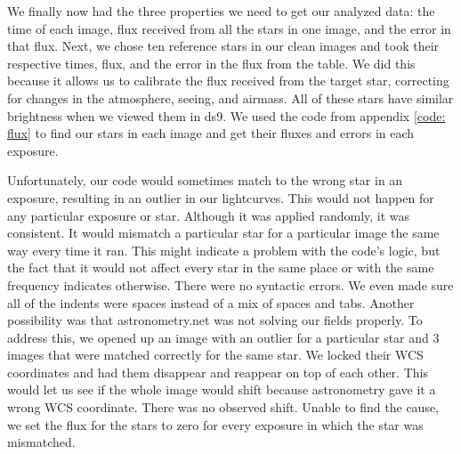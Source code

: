 \documentclass{aastex61}
\begin{document}
We finally now had the three properties we need to get our analyzed data: the time of each image, flux received from all the stars in one image, and the error in that flux. Next, we chose ten reference stars in our clean images and took their respective times, flux, and the error in the flux from the table. We did this because it allows us to calibrate the flux received from the target star, correcting for changes in the atmosphere, seeing, and airmass. All of these stars have similar brightness when we viewed them in ds9. We used the code from appendix \ref{code: flux} to find our stars in each image and get their fluxes and errors in each exposure. 

Unfortunately, our code would sometimes match to the wrong star in an exposure, resulting in an outlier in our lightcurves. This would not happen for any particular exposure or star. Although it was applied randomly, it was consistent. It would mismatch a particular star for a particular image the same way every time it ran. This might indicate a problem with the code's logic, but the fact that it would not affect every star in the same place or with the same frequency indicates otherwise. There were no syntactic errors. We even made sure all of the indents were spaces instead of a mix of spaces and tabs. Another possibility was that astronometry.net was not solving our fields properly. To address this, we opened up an image with an outlier for a particular star and 3 images that were matched correctly for the same star. We locked their WCS coordinates and had them disappear and reappear on top of each other. This would let us see if the whole image would shift because astronometry gave it a wrong WCS coordinate. There was no observed shift. Unable to find the cause, we set the flux for the stars to zero for every exposure in which the star was mismatched. 
\end{document}
